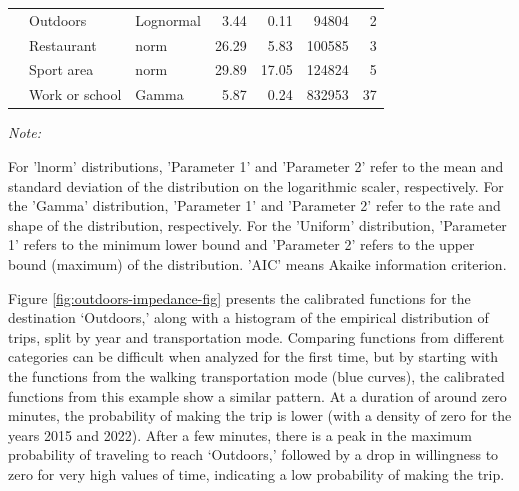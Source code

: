 \documentclass[preprint, 3p,
authoryear]{elsarticle} %
\begin{document}
\begin{table}
{\begin{threeparttable}
\begin{tabular}[t]{rllrrrr}
 & Outdoors & Lognormal & 3.44 & 0.11 & 94804 & 2\\

 & Restaurant & norm & 26.29 & 5.83 & 100585 & 3\\

 & Sport area & norm & 29.89 & 17.05 & 124824 & 5\\

\multirow[t]{-7}{*}{\raggedleft\arraybackslash 2022} & Work or school & Gamma & 5.87 & 0.24 & 832953 & 37\\
\bottomrule
\end{tabular}
\begin{tablenotes}
\item \textit{Note: } 
\item For 'lnorm' distributions, 'Parameter 1' and 'Parameter 2' refer to the mean and standard deviation of the distribution on the logarithmic scaler, respectively. For the 'Gamma' distribution, 'Parameter 1' and 'Parameter 2' refer to the rate and shape of the distribution, respectively. For the 'Uniform' distribution,  'Parameter 1' refers to the minimum lower bound and 'Parameter 2'  refers to the upper bound (maximum) of the distribution.  'AIC' means Akaike information criterion.
\end{tablenotes}
\end{threeparttable}}
\end{table}

Figure \ref{fig:outdoors-impedance-fig} presents the calibrated
functions for the destination `Outdoors,' along with a histogram of the
empirical distribution of trips, split by year and transportation mode.
Comparing functions from different categories can be difficult when
analyzed for the first time, but by starting with the functions from the
walking transportation mode (blue curves), the calibrated functions from
this example show a similar pattern. At a duration of around zero
minutes, the probability of making the trip is lower (with a density of
zero for the years 2015 and 2022). After a few minutes, there is a peak
in the maximum probability of traveling to reach `Outdoors,' followed by
a drop in willingness to zero for very high values of time, indicating a
low probability of making the trip.
\end{document}

